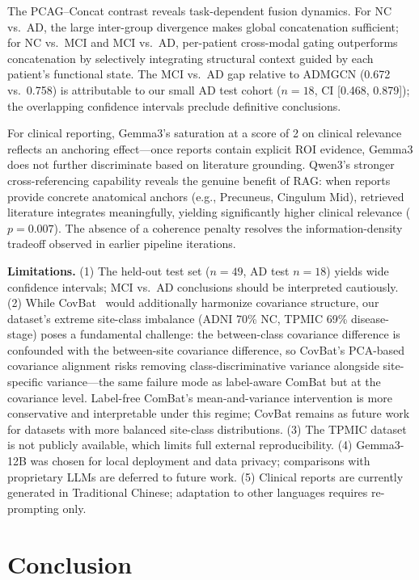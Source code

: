 \documentclass[conference]{IEEEtran}
\begin{document}
The PCAG--Concat contrast reveals task-dependent fusion dynamics. For NC vs.\ AD, the large inter-group divergence makes global concatenation sufficient; for NC vs.\ MCI and MCI vs.\ AD, per-patient cross-modal gating outperforms concatenation by selectively integrating structural context guided by each patient's functional state. The MCI vs.\ AD gap relative to ADMGCN (0.672 vs.\ 0.758) is attributable to our small AD test cohort ($n{=}18$, CI [0.468, 0.879]); the overlapping confidence intervals preclude definitive conclusions.

For clinical reporting, Gemma3's saturation at a score of 2 on clinical relevance reflects an anchoring effect---once reports contain explicit ROI evidence, Gemma3 does not further discriminate based on literature grounding. Qwen3's stronger cross-referencing capability reveals the genuine benefit of RAG: when reports provide concrete anatomical anchors (e.g., Precuneus, Cingulum Mid), retrieved literature integrates meaningfully, yielding significantly higher clinical relevance ($p{=}0.007$). The absence of a coherence penalty resolves the information-density tradeoff observed in earlier pipeline iterations.

\textbf{Limitations.} (1) The held-out test set ($n{=}49$, AD test $n{=}18$) yields wide confidence intervals; MCI vs.\ AD conclusions should be interpreted cautiously. (2) While CovBat~\cite{chen2022covbat} would additionally harmonize covariance structure, our dataset's extreme site-class imbalance (ADNI 70\% NC, TPMIC 69\% disease-stage) poses a fundamental challenge: the between-class covariance difference is confounded with the between-site covariance difference, so CovBat's PCA-based covariance alignment risks removing class-discriminative variance alongside site-specific variance---the same failure mode as label-aware ComBat but at the covariance level. Label-free ComBat's mean-and-variance intervention is more conservative and interpretable under this regime; CovBat remains as future work for datasets with more balanced site-class distributions. (3) The TPMIC dataset is not publicly available, which limits full external reproducibility. (4) Gemma3-12B was chosen for local deployment and data privacy; comparisons with proprietary LLMs are deferred to future work. (5) Clinical reports are currently generated in Traditional Chinese; adaptation to other languages requires re-prompting only.

\section{Conclusion}
\end{document}
